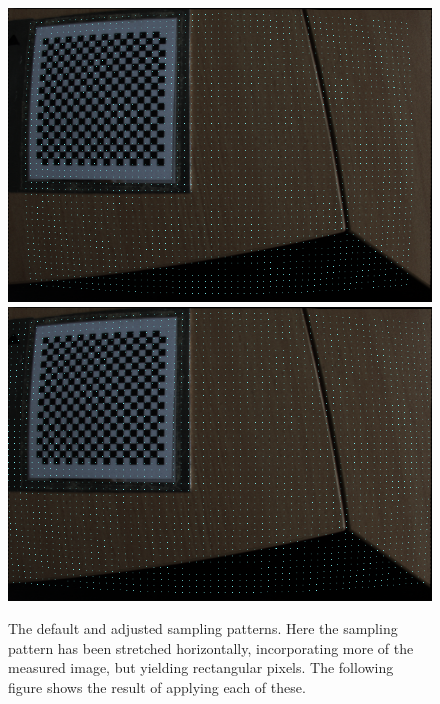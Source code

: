 \documentclass[onecolumn]{article}
\begin{document}
\begin{figure}[tbhp]
	\centering
	\includegraphics[width=1\textwidth]{Figs/SampPatternOrig}
	\includegraphics[width=1\textwidth]{Figs/SampPatternWide}
	\caption{The default and adjusted sampling patterns.  Here the sampling pattern has been stretched horizontally, incorporating more of the measured image, but yielding rectangular pixels. The following figure shows the result of applying each of these.}
	\label{fig_AdjustRectIntrinsic}
\end{figure}
\end{document}
